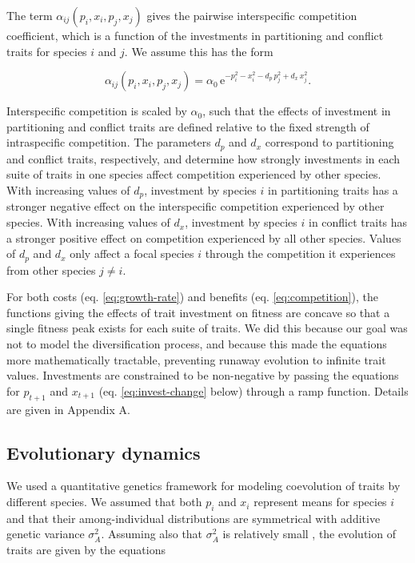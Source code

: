 The term $\alpha_{ij}( p_{i},x_{i},p_{j},x_{j} )$ gives the
pairwise interspecific competition coefficient, which is a function of
the investments in partitioning and conflict traits for species $i$
and $j$. We assume this has the form

\begin{equation} \label{eq:competition}
    \alpha_{ij}(p_i, x_i, p_j, x_j) = \alpha_0 \,
        \text{e}^{-p_i^2 - x_i^2 - d_p \, p_j^2 + d_x \, x_j^2 }
	\textrm{.}
\end{equation}


Interspecific competition is scaled by $\alpha_{0}$, such that the
effects of investment in partitioning and conflict traits are defined
relative to the fixed strength of intraspecific competition. The
parameters $d_{p}$ and $d_{x}$ correspond to partitioning and
conflict traits, respectively, and determine how strongly investments in
each suite of traits in one species affect competition experienced by
other species. With increasing values of $d_{p}$, investment by
species $i$ in partitioning traits has a stronger negative effect on
the interspecific competition experienced by other species. With
increasing values of $d_{x}$, investment by species $i$ in conflict
traits has a stronger positive effect on competition experienced by all
other species. Values of $d_{p}$ and $d_{x}$ only affect a focal
species $i$ through the competition it experiences from other species
$j \neq i$.

For both costs (eq. \ref{eq:growth-rate}) and 
benefits (eq. \ref{eq:competition}), the functions giving the
effects of trait investment on fitness are concave so that a single
fitness peak exists for each suite of traits. We did this because our
goal was not to model the diversification process, and because this made
the equations more mathematically tractable, preventing runaway
evolution to infinite trait values. Investments are constrained to be
non-negative by passing the equations for $p_{t + 1}$ and
$x_{t + 1}$ (eq. \ref{eq:invest-change} below) through a ramp function. 
Details are given in Appendix A.

\subsection*{Evolutionary dynamics}

We used a quantitative genetics framework for modeling coevolution of
traits by different species. We assumed that both $p_{i}$ and
$x_{i}$ represent means for species $i$ and that their
among-individual distributions are symmetrical with additive genetic
variance $\sigma_{A}^{2}$. Assuming also that $\sigma_{A}^{2}$ is
relatively small \citep{Abrams1993b, Abrams2001a, Iwasa1991a},
the evolution of traits are given by the equations



